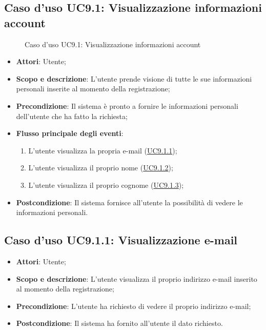 \documentclass[12pt,a4paper]{article}
\begin{document}
\subsection{Caso d'uso UC9.1: Visualizzazione informazioni account}
\begin{figure}[H]
	\centering

	\caption{Caso d'uso UC9.1: Visualizzazione informazioni account}\label{fig:UC9.1} 
\end{figure}\begin{itemize}
\item \textbf{Attori}: Utente;
\item \textbf{Scopo e descrizione}: L’utente prende visione di tutte le sue informazioni personali inserite al momento della
registrazione; 
\item \textbf{Precondizione}: Il sistema è pronto a fornire le informazioni personali dell’utente che ha fatto la richiesta;

\item \textbf{Flusso principale degli eventi}:
\begin{enumerate}
	\item L’utente visualizza la propria e-mail (\hyperlink{UC9.1.1}{UC9.1.1});
	\item L’utente visualizza il proprio nome (\hyperlink{UC9.1.2}{UC9.1.2});
	\item L’utente visualizza il proprio cognome (\hyperlink{UC9.1.3}{UC9.1.3});
	
\end{enumerate}
\item \textbf{Postcondizione}: Il sistema fornisce all’utente la possibilità di vedere le informazioni personali.
\end{itemize}
\hypertarget{UC9.1.1}{}
\subsection{Caso d'uso UC9.1.1:  Visualizzazione e-mail}\begin{itemize}
	\item \textbf{Attori}: Utente;
	\item \textbf{Scopo e descrizione}: L’utente visualizza il proprio indirizzo e-mail inserito al momento della registrazione; 
	\item \textbf{Precondizione}: L’utente ha richiesto di vedere il proprio indirizzo e-mail;
	\item \textbf{Postcondizione}: Il sistema ha fornito all’utente il dato richiesto.
\end{itemize}
\hypertarget{UC9.1.2}{}
\end{document}
